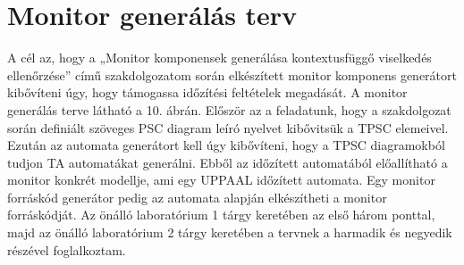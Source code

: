 \chapter{Monitor generálás terv}

A cél az, hogy a „Monitor komponensek generálása kontextusfüggő viselkedés ellenőrzése” című szakdolgozatom során elkészített monitor komponens generátort kibővíteni úgy, hogy támogassa időzítési feltételek megadását. A monitor generálás terve látható a 10. ábrán. Először az a feladatunk, hogy a szakdolgozat során definiált szöveges PSC diagram leíró nyelvet kibővitsük a TPSC elemeivel. Ezután az automata generátort kell úgy kibővíteni, hogy a TPSC diagramokból tudjon TA automatákat generálni. Ebből az időzített automatából előallítható a monitor konkrét modellje, ami egy UPPAAL időzített automata. Egy monitor forráskód generátor pedig az automata alapján elkészítheti a monitor forráskódját. Az önálló laboratórium 1 tárgy keretében az első három ponttal, majd az önálló laboratórium 2 tárgy keretében a tervnek a harmadik és negyedik részével foglalkoztam.